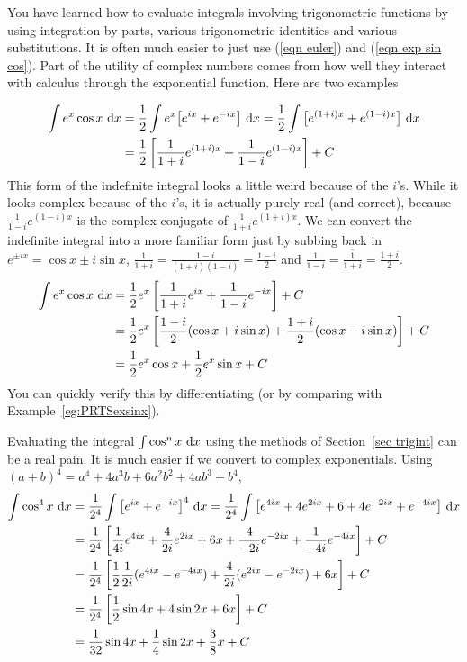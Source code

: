 You have learned how to evaluate integrals involving trigonometric functions
by using integration by parts, various trigonometric identities and various
substitutions. It is often much easier to just use (\ref{eqn euler}) and
(\ref{eqn exp sin cos}). Part of the utility of complex numbers comes from 
how well they interact with calculus through the exponential function.
Here are two examples
\begin{eg}\label{eg complex calc A}
\begin{align*}
\int e^x\cos x\ \mathrm{d}x&=\frac{1}{2} \int e^x\big[e^{ix}+e^{-ix}\big]\ \mathrm{d}x
=\frac{1}{2}  \int \big[e^{(1+i)x}+e^{(1-i)x}\big]\ \mathrm{d}x \\
&=\frac{1}{2}  \left[\frac{1}{1+i}e^{(1+i)x}+\frac{1}{1-i}e^{(1-i)x}\right]+C
\end{align*}
This form of the indefinite integral looks a little weird because of
the $i$'s. While it looks complex because of the $i$'s, it is actually purely real (and correct), because $\frac{1}{1-i}e^{(1-i)x}$ is the complex conjugate 
of $\frac{1}{1+i}e^{(1+i)x}$. We can convert the indefinite integral into
a more familiar form just by subbing back in $e^{\pm ix}=\cos x\pm i\sin x$,
$\frac{1}{1+i}=\frac{1-i}{(1+i)(1-i)}=\frac{1-i}{2}$ and
$\frac{1}{1-i}=\overline{\frac{1}{1+i}}=\frac{1+i}{2}$. 
\begin{align*}
\int e^x\cos x\ \mathrm{d}x
&=\frac{1}{2}  e^x\left[\frac{1}{1+i}e^{ix}+\frac{1}{1-i}e^{-ix}\right]+C\\
&=\frac{1}{2}  e^x\left[\frac{1-i}{2}(\cos x+i\sin x)
   +\frac{1+i}{2}(\cos x-i\sin x)\right]+C \\
&=\frac{1}{2}  e^x\cos x+\frac{1}{2} e^x\sin x+C
\end{align*}
You can quickly verify this by differentiating (or by comparing with 
Example~\ref{eg:PRTSexsinx}).
\end{eg}

\begin{eg}\label{eg complex calc B}
Evaluating the integral $\int\cos^nx\ \dee{x}$ using the methods of Section~\ref{sec trigint} can be a real pain. It is much easier if we convert
to complex exponentials. Using $(a+b)^4=a^4+4a^3b+6a^2b^2+4ab^3+b^4$,
\begin{align*}
\int \cos^4 x\ \dee{x}&=\frac{1}{2^4} \int\big[e^{ix}+e^{-ix}\big]^4\ \dee{x}
=\frac{1}{2^4} \int \big[e^{4ix}+4e^{2ix}+6+4e^{-2ix}+e^{-4ix}\big]\ \dee{x} \\
&=\frac{1}{2^4} \left[\frac{1}{4i}e^{4ix}+\frac{4}{2i}e^{2ix}+6x
+\frac{4}{-2i}e^{-2ix}+\frac{1}{-4i}e^{-4ix}\right]+C\cr
&=\frac{1}{2^4} \left[\frac{1}{2}\frac{1}{2i}(e^{4ix}-e^{-4ix})
              +\frac{4}{2i}(e^{2ix}-e^{-2ix})+6x\right]+C\cr
&=\frac{1}{2^4} \left[\frac{1}{2}\sin 4x+4\sin 2x+6x\right]+C \\
&=\frac{1}{32} \sin 4x+\frac{1}{4}\sin 2x+\frac{3}{8}x+C
\end{align*}
\end{eg}

